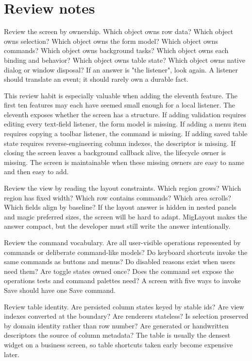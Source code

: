 \section{Review notes}

Review the screen by ownership. Which object owns row data? Which object owns
selection? Which object owns the form model? Which object owns commands? Which
object owns background tasks? Which object owns each binding and behavior?
Which object owns table state? Which object owns native dialog or window
disposal? If an answer is "the listener", look again. A listener should
translate an event; it should rarely own a durable fact.

This review habit is especially valuable when adding the eleventh feature. The
first ten features may each have seemed small enough for a local listener. The
eleventh exposes whether the screen has a structure. If adding validation
requires editing every text-field listener, the form model is missing. If
adding a menu item requires copying a toolbar listener, the command is
missing. If adding saved table state requires reverse-engineering column
indexes, the descriptor is missing. If closing the screen leaves a background
callback alive, the lifecycle owner is missing. The screen is maintainable
when these missing owners are easy to name and then easy to add.

Review the view by reading the layout constraints. Which region grows? Which
region has fixed width? Which row contains commands? Which area scrolls? Which
fields align by baseline? If the layout answer is hidden in nested panels and
magic preferred sizes, the screen will be hard to adapt. MigLayout makes the
answer compact, but the developer must still write the answer intentionally.

Review the command vocabulary. Are all user-visible operations represented by
commands or deliberate command-like models? Do keyboard shortcuts invoke the
same commands as buttons and menus? Do disabled reasons exist when users need
them? Are toggle states owned once? Does the command set expose the operations
tests and command palettes need? A screen with five ways to invoke Save should
have one Save command.

Review table identity. Are persisted column states keyed by stable ids? Are
view indexes converted at the boundary? Are renderers stateless? Is selection
preserved by domain identity rather than row number? Are generated or
handwritten descriptors the source of column metadata? The table is usually
the densest widget on a business screen, so table shortcuts taken early become
expensive later.

